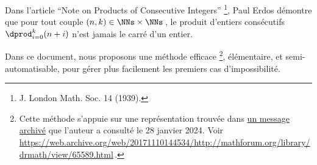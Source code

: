Dans l'article \enquote{Note on Products of Consecutive Integers}
\footnote{
	J. London Math. Soc. 14 (1939).
},
Paul Erdos démontre que pour tout couple $(n, k) \in \NNs \times \NNs$\,, le produit d'entiers consécutifs $\dprod_{i = 0}^{k} (n + i)$ n'est jamais le carré d'un entier.

\smallskip

Dans ce document, nous proposons une méthode efficace
\footnote{
	Cette méthode s'appuie sur une représentation trouvée dans \href{https://web.archive.org/web/20171110144534/http://mathforum.org/library/drmath/view/65589.html}{un message archivé} que l'auteur a consulté le 28 janvier 2024.
	Voir \url{https://web.archive.org/web/20171110144534/http://mathforum.org/library/drmath/view/65589.html}\,.
},
élémentaire, et semi-automatisable, pour gérer plus facilement les premiers cas d'impossibilité.

